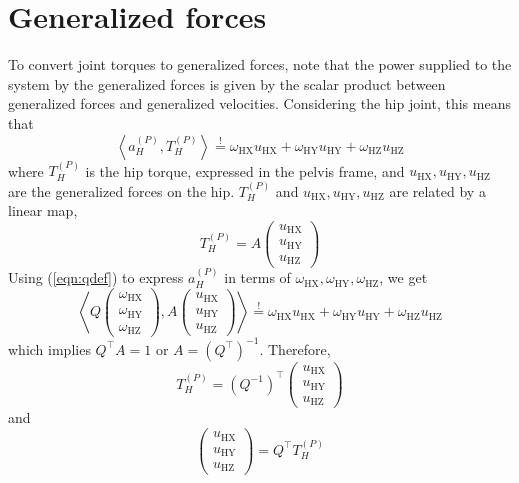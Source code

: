\documentclass[a4paper]{article}
\begin{document}
\section{Generalized forces}
To convert joint torques to generalized forces, note that the power supplied to the system by the generalized forces is given by the scalar product between generalized forces and generalized velocities. Considering the hip joint, this means that
\begin{equation}
\left<a_H^{(P)}, T_H^{(P)}\right> \stackrel{!}{=} \omega_\mathrm{HX} u_\mathrm{HX} + \omega_\mathrm{HY} u_\mathrm{HY} + \omega_\mathrm{HZ} u_\mathrm{HZ}
\end{equation}
where $T_H^{(P)}$ is the hip torque, expressed in the pelvis frame, and $u_\mathrm{HX}, u_\mathrm{HY}, u_\mathrm{HZ}$ are the generalized forces on the hip. $T_H^{(P)}$ and $u_\mathrm{HX}, u_\mathrm{HY}, u_\mathrm{HZ}$ are related by a linear map,
\begin{equation}
T_H^{(P)} = A \left(\begin{array}{c}
u_\mathrm{HX} \\ u_\mathrm{HY} \\ u_\mathrm{HZ}
\end{array}\right)
\end{equation}
Using (\ref{eqn:qdef}) to express $a_H^{(P)}$ in terms of $\omega_\mathrm{HX}, \omega_\mathrm{HY}, \omega_\mathrm{HZ}$, we get
\begin{equation}
\left<Q
\left(\begin{array}{c}
\omega_\mathrm{HX} \\ \omega_\mathrm{HY} \\ \omega_\mathrm{HZ}
\end{array}\right), A
\left(\begin{array}{c}
u_\mathrm{HX} \\ u_\mathrm{HY} \\ u_\mathrm{HZ}
\end{array}\right)
\right> \stackrel{!}{=} \omega_\mathrm{HX} u_\mathrm{HX} + \omega_\mathrm{HY} u_\mathrm{HY} + \omega_\mathrm{HZ} u_\mathrm{HZ}
\end{equation}
which implies $Q^\top A = 1$ or $A = (Q^\top)^{-1}$. Therefore,
\begin{equation}
T_H^{(P)} = (Q^{-1})^\top \left(\begin{array}{c}
u_\mathrm{HX} \\ u_\mathrm{HY} \\ u_\mathrm{HZ}
\end{array}\right)
\end{equation}
and
\begin{equation}
\left(\begin{array}{c}
u_\mathrm{HX} \\ u_\mathrm{HY} \\ u_\mathrm{HZ}
\end{array}\right)
= Q^\top T_H^{(P)}
\end{equation}
\end{document}
